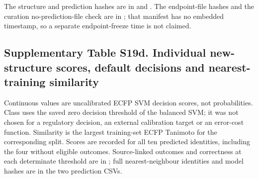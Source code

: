 The structure and prediction hashes are in  and . The endpoint-file hashes and the curation no-prediction-file check are in ; that manifest has no embedded timestamp, so a separate endpoint-freeze time is not claimed.

\subsection*{Supplementary Table S19d. Individual new-structure scores, default decisions and nearest-training similarity}

Continuous values are uncalibrated ECFP SVM decision scores, not probabilities. Class uses the saved zero decision threshold of the balanced SVM; it was not chosen for a regulatory decision, an external calibration target or an error-cost function. Similarity is the largest training-set ECFP Tanimoto for the corresponding split. Scores are recorded for all ten predicted identities, including the four without eligible outcomes. Source-linked outcomes and correctness at each determinate threshold are in ; full nearest-neighbour identities and model hashes are in the two prediction CSVs.

\begingroup\small\setlength{\tabcolsep}{4pt}

